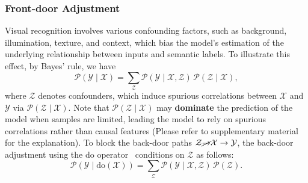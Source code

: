 \subsubsection{Front-door Adjustment}
Visual recognition involves various confounding factors, such as background, illumination, texture, and context, which bias the model’s estimation of the underlying relationship between inputs and semantic labels.
To illustrate this effect, by Bayes' rule, we have
\begin{equation}
    \mathcal{P}(\mathcal{Y} \mid \mathcal{X}) 
    = \sum_{\mathcal{Z}} \mathcal{P}(\mathcal{Y} \mid \mathcal{X}, \mathcal{Z}) \, \mathcal{P}(\mathcal{Z} \mid \mathcal{X}),
    \label{equ:bayes_rule}
\end{equation}
where $\mathcal{Z}$ denotes confounders, which induce spurious correlations between $\mathcal{X}$ and $\mathcal{Y}$ via $\mathcal{P}(\mathcal{Z}\mid\mathcal{X})$.
Note that $\mathcal{P}(\mathcal{Z}\mid\mathcal{X})$ may \textbf{dominate} the prediction of the model when samples are limited, leading the model to rely on spurious correlations rather than causal features (Please refer to supplementary material for the explanation).
To block the back-door paths $\mathcal{Z} \cancel{\to} \mathcal{X} \to \mathcal{Y}$, the back-door adjustment using the do operator~\cite{pearl2018book} conditions on $\mathcal{Z}$ as follows:
\begin{equation}
    \mathcal{P}(\mathcal{Y} \mid \mathrm{do}(\mathcal{X})) 
    = \sum_{\mathcal{Z}} \mathcal{P}(\mathcal{Y} \mid \mathcal{X}, \mathcal{Z}) \, \mathcal{P}(\mathcal{Z}).
    \label{equ:back_door_adjustment}
\end{equation}




